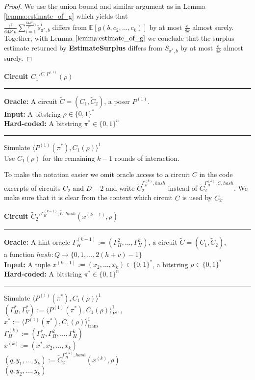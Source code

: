 \begin{proof}
We use the union bound and similar argument as in Lemma \ref{lemma:estimate_of_g}
which yields that \\$\frac{\epsilon^2}{64k^2n} \sum_{i=1}^{\frac{64k^2}{\epsilon^2}n} \widetilde{s}_{\pi^*,b}^i$ differs from
$\mathbb{E}[g(b, c_2, \dots, c_k)]$ by at most $\frac{\epsilon}{8k}$ almost surely. Together, with Lemma $\ref{lemma:estimate_of_g}$ we conclude that the surplus estimate
returned by \textbf{EstimateSurplus} differs from $S_{\pi^*,b}$ by at most $\frac{\epsilon}{4k}$ almost surely.
\end{proof}
%
%
\begin{codeblock}
  \textbf{Circuit $C_1'^{\widetilde{C}, P^{(1)}}(\rho)$}
  \medskip \hrule \medskip
  \textbf{Oracle:} A circuit $\widetilde{C} = (C_1, \widetilde{C}_2)$, a poser $P^{(1)}$. \\
  \textbf{Input:}  A bitstring $\rho \in \{0,1\}^{*}$ \\
  \textbf{Hard-coded:} A bitstring $\pi^* \in \{0,1\}^{n}$
  \medskip\hrule\medskip
  Simulate $\langle P^{(1)}(\pi^*), C_1(\rho)\rangle^1$ \\
  Use $C_1(\rho)$ for the remaining $k-1$ rounds of interaction.
\end{codeblock}
%
To make the notation easier we omit oracle access to a circuit $C$ in the code excerpts of circuits $C_2$ and $D-2$
and write $\widetilde{C}_2^{\Gamma_H^{(k)}, hash}$ instead of $\widetilde{C}_2^{\Gamma_H^{(k)}, C, hash}$.
We make sure that it is clear from the context which circuit $C$ is used by $\widetilde{C}_2$.
%
\begin{codeblock}
  \textbf{Circuit $\widetilde{C}_2'^{\Gamma_H^{(k-1)}, \widetilde{C}, hash}(x^{(k-1)}, \rho)$}
  \medskip \hrule \medskip
  \textbf{Oracle:} A hint oracle $\Gamma_H^{(k-1)} := (\Gamma_H^{2}, \dots, \Gamma_H^{k})$, a circuit $\widetilde{C} = (C_1, \widetilde{C}_2)$, \\
  \IndII a function $hash: Q \rightarrow \{0,1,\dots, 2(h+v)-1\}$ \\
  \textbf{Input:}  A tuple $x^{(k-1)} := (x_2, \dots, x_{k}) \in \{0,1\}^{*}$, a bitstring $\rho \in \{0,1\}^{*}$\\
  \textbf{Hard-coded:} A bitstring $\pi^* \in \{0,1\}^{n}$
  \medskip\hrule\medskip
  Simulate $\langle P^{(1)}(\pi^*), C_1(\rho) \rangle^{1}$ \\
  \IndI $(\Gamma_H^*, \Gamma_V^*) := \langle P^{(1)}(\pi^*), C_1(\rho) \rangle^{1}_{P^{(1)}}$ \\
  \IndI $x^* := \langle P^{(1)}(\pi^*), C_1(\rho) \rangle^{1}_{\text{trans}}$ \\
  $\Gamma_H^{(k)} := (\Gamma_H^*, \Gamma_H^{2}, \dots, \Gamma_H^{k})$ \\
  $x^{(k)} := (x^*, x_2, \dots, x_{k})$ \\
  $(q, y_1, \dots, y_k) := \widetilde{C}_2^{\Gamma_H^{(k)}, hash}(x^{(k)}, \rho)$ \\
  \Return $(q, y_2, \dots, y_k)$
\end{codeblock}
